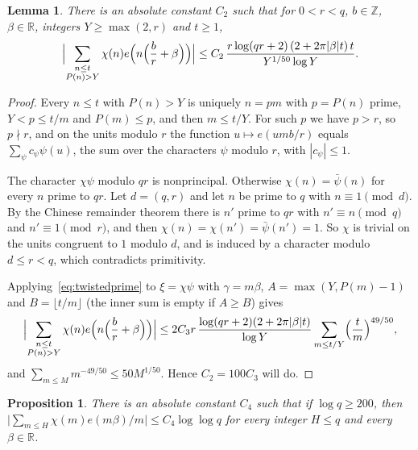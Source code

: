 \documentclass[screen,reqno]{aomart}
\numberwithin{equation}{section}
\newtheorem{lemma}[theorem]{Lemma}
\newtheorem{proposition}[theorem]{Proposition}
\theoremstyle{definition}
\newcommand{\R}{\mathbb{R}}
\newcommand{\Z}{\mathbb{Z}}
\begin{document}
\begin{lemma}\label{lem:major}
There is an absolute constant $C_2$ such that for $0<r<q$, $b\in\Z$, $\beta\in\R$, integers
$Y\ge\max(2,r)$ and $t\ge1$,
\[
  \Bigl|\sum_{\substack{n\le t\\P(n)>Y}}\chi(n)e\Bigl(n\Bigl(\frac br+\beta\Bigr)\Bigr)\Bigr|
  \le C_2\,\frac{r\log(qr+2)\,(2+2\pi|\beta|t)\,t}{Y^{1/50}\log Y}.
\]
\end{lemma}

\begin{proof}
Every $n\le t$ with $P(n)>Y$ is uniquely $n=pm$ with $p=P(n)$ prime, $Y<p\le t/m$ and
$P(m)\le p$, and then $m\le t/Y$. For such $p$ we have $p>r$, so $p\nmid r$, and on the units
modulo $r$ the function $u\mapsto e(umb/r)$ equals $\sum_\psi c_\psi\psi(u)$, the sum over the
characters $\psi$ modulo $r$, with $|c_\psi|\le1$.

The character $\chi\psi$ modulo $qr$ is nonprincipal. Otherwise $\chi(n)=\bar\psi(n)$ for every
$n$ prime to $qr$. Let $d=(q,r)$ and let $n$ be prime to $q$ with $n\equiv1\pmod d$. By the
Chinese remainder theorem there is $n'$ prime to $qr$ with $n'\equiv n\pmod q$ and
$n'\equiv1\pmod r$, and then $\chi(n)=\chi(n')=\bar\psi(n')=1$. So $\chi$ is trivial on the
units congruent to $1$ modulo $d$, and is induced by a character modulo $d\le r<q$, which
contradicts primitivity.

Applying~\eqref{eq:twistedprime} to $\xi=\chi\psi$ with $\gamma=m\beta$,
$A=\max(Y,P(m)-1)$ and $B=\lfloor t/m\rfloor$ (the inner sum is empty if $A\ge B$) gives
\[
  \Bigl|\sum_{\substack{n\le t\\P(n)>Y}}\chi(n)e\Bigl(n\Bigl(\frac br+\beta\Bigr)\Bigr)\Bigr|
  \le2C_3r\,\frac{\log(qr+2)(2+2\pi|\beta|t)}{\log Y}\sum_{m\le t/Y}\Bigl(\frac tm\Bigr)^{49/50},
\]
and $\sum_{m\le M}m^{-49/50}\le50M^{1/50}$. Hence $C_2=100C_3$ will do.
\end{proof}

\begin{proposition}\label{prop:hsum}
There is an absolute constant $C_4$ such that if $\log q\ge200$, then
$\bigl|\sum_{m\le H}\chi(m)e(m\beta)/m\bigr|\le C_4\log\log q$ for every integer $H\le q$ and
every $\beta\in\R$.
\end{proposition}
\end{document}
